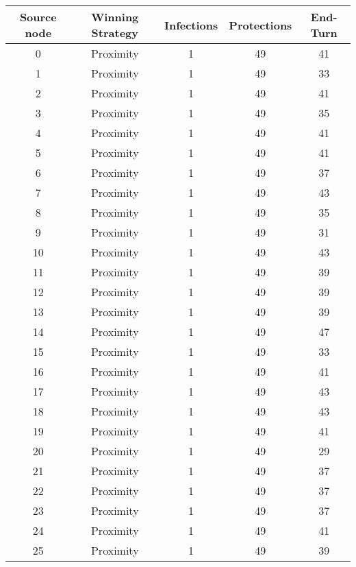 \documentclass[results.tex]{subfiles}
\begin{document}
\begin{center}
  \begin{tabular}{| c || c | c | c | c |}
    \hline
    {\bfseries Source node} & {\bfseries Winning Strategy} & {\bfseries Infections} & {\bfseries Protections} & {\bfseries End-Turn} \\  %
    \hline\hline
    0 & Proximity & 1 & 49 & 41 \\ 
    \hline
    1 & Proximity & 1 & 49 & 33 \\ 
    \hline
    2 & Proximity & 1 & 49 & 41 \\ 
    \hline
    3 & Proximity & 1 & 49 & 35 \\ 
    \hline
    4 & Proximity & 1 & 49 & 41 \\ 
    \hline
    5 & Proximity & 1 & 49 & 41 \\ 
    \hline
    6 & Proximity & 1 & 49 & 37 \\ 
    \hline
    7 & Proximity & 1 & 49 & 43 \\ 
    \hline
    8 & Proximity & 1 & 49 & 35 \\ 
    \hline
    9 & Proximity & 1 & 49 & 31 \\ 
    \hline
    10 & Proximity & 1 & 49 & 43 \\ 
    \hline
    11 & Proximity & 1 & 49 & 39 \\ 
    \hline
    12 & Proximity & 1 & 49 & 39 \\ 
    \hline
    13 & Proximity & 1 & 49 & 39 \\ 
    \hline
    14 & Proximity & 1 & 49 & 47 \\ 
    \hline
    15 & Proximity & 1 & 49 & 33 \\ 
    \hline
    16 & Proximity & 1 & 49 & 41 \\ 
    \hline
    17 & Proximity & 1 & 49 & 43 \\ 
    \hline
    18 & Proximity & 1 & 49 & 43 \\ 
    \hline
    19 & Proximity & 1 & 49 & 41 \\ 
    \hline
    20 & Proximity & 1 & 49 & 29 \\ 
    \hline
    21 & Proximity & 1 & 49 & 37 \\ 
    \hline
    22 & Proximity & 1 & 49 & 37 \\ 
    \hline
    23 & Proximity & 1 & 49 & 37 \\ 
    \hline
    24 & Proximity & 1 & 49 & 41 \\ 
    \hline
    25 & Proximity & 1 & 49 & 39 \\ 

\end{tabular}
\end{center}
\end{document}
